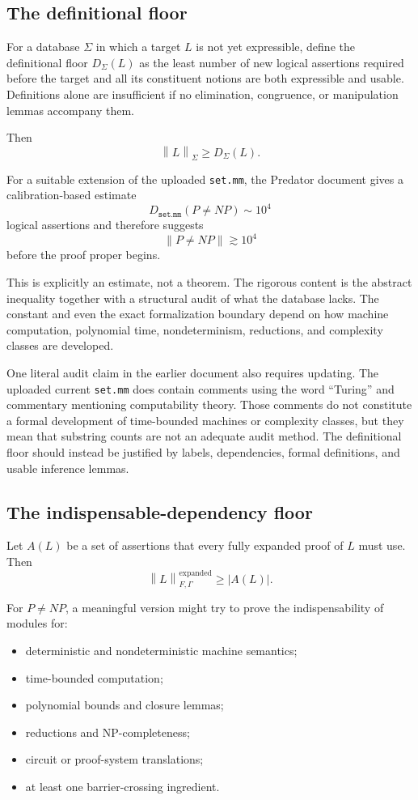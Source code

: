 \documentclass[11pt,letterpaper]{article}
\theoremstyle{named}
\newcommand{\prooflen}[2]{\left\lVert #1\right\rVert_{#2}}
\begin{document}
\subsection{The definitional floor}

For a database $\Sigma$ in which a target $L$ is not yet expressible, define the definitional floor $D_\Sigma(L)$ as the least number of new logical assertions required before the target and all its constituent notions are both expressible and usable. Definitions alone are insufficient if no elimination, congruence, or manipulation lemmas accompany them.

Then
\[
\prooflen{L}{\Sigma}
\ge
D_\Sigma(L).
\]

For a suitable extension of the uploaded \texttt{set.mm}, the Predator document gives a calibration-based estimate
\[
D_{\texttt{set.mm}}(P\ne NP)\sim 10^4
\]
logical assertions and therefore suggests
\[
\|P\ne NP\|\gtrsim 10^4
\]
before the proof proper begins.

This is explicitly an estimate, not a theorem. The rigorous content is the abstract inequality together with a structural audit of what the database lacks. The constant and even the exact formalization boundary depend on how machine computation, polynomial time, nondeterminism, reductions, and complexity classes are developed.

One literal audit claim in the earlier document also requires updating. The uploaded current \texttt{set.mm} does contain comments using the word ``Turing'' and commentary mentioning computability theory. Those comments do not constitute a formal development of time-bounded machines or complexity classes, but they mean that substring counts are not an adequate audit method. The definitional floor should instead be justified by labels, dependencies, formal definitions, and usable inference lemmas.

\subsection{The indispensable-dependency floor}

Let $A(L)$ be a set of assertions that every fully expanded proof of $L$ must use. Then
\[
\prooflen{L}{F,\Gamma}^{\mathrm{expanded}}
\ge
|A(L)|.
\]

For $P\ne NP$, a meaningful version might try to prove the indispensability of modules for:

\begin{itemize}
\item deterministic and nondeterministic machine semantics;
\item time-bounded computation;
\item polynomial bounds and closure lemmas;
\item reductions and NP-completeness;
\item circuit or proof-system translations;
\item at least one barrier-crossing ingredient.
\end{itemize}
\end{document}
